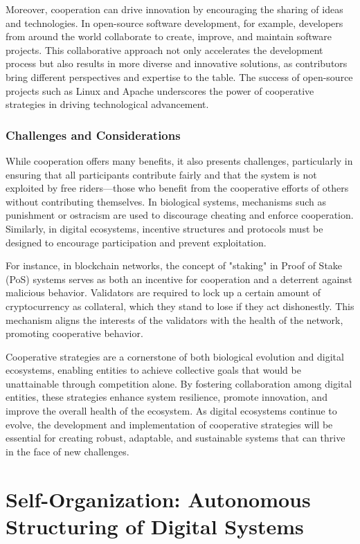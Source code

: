 \documentclass[12pt,twoside]{article}
\begin{document}
Moreover, cooperation can drive innovation by encouraging the sharing of ideas and technologies. In open-source software development, for example, developers from around the world collaborate to create, improve, and maintain software projects. This collaborative approach not only accelerates the development process but also results in more diverse and innovative solutions, as contributors bring different perspectives and expertise to the table. The success of open-source projects such as Linux and Apache underscores the power of cooperative strategies in driving technological advancement.

\subsubsection{Challenges and Considerations}

While cooperation offers many benefits, it also presents challenges, particularly in ensuring that all participants contribute fairly and that the system is not exploited by free riders—those who benefit from the cooperative efforts of others without contributing themselves. In biological systems, mechanisms such as punishment or ostracism are used to discourage cheating and enforce cooperation. Similarly, in digital ecosystems, incentive structures and protocols must be designed to encourage participation and prevent exploitation.

For instance, in blockchain networks, the concept of "staking" in Proof of Stake (PoS) systems serves as both an incentive for cooperation and a deterrent against malicious behavior. Validators are required to lock up a certain amount of cryptocurrency as collateral, which they stand to lose if they act dishonestly. This mechanism aligns the interests of the validators with the health of the network, promoting cooperative behavior.

Cooperative strategies are a cornerstone of both biological evolution and digital ecosystems, enabling entities to achieve collective goals that would be unattainable through competition alone. By fostering collaboration among digital entities, these strategies enhance system resilience, promote innovation, and improve the overall health of the ecosystem. As digital ecosystems continue to evolve, the development and implementation of cooperative strategies will be essential for creating robust, adaptable, and sustainable systems that can thrive in the face of new challenges.

\section{Self-Organization: Autonomous Structuring of Digital Systems}
\end{document}
